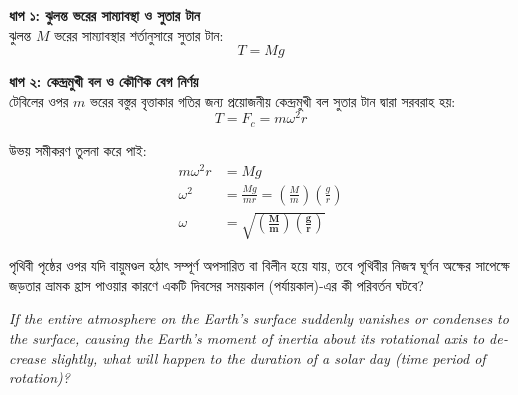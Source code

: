 \documentclass[12pt, a4paper]{article}
\begin{document}
\begin{tcolorbox}[solutionbox={সমাধান (Solution)}]
    \noindent
    \textbf{ধাপ ১: ঝুলন্ত ভরের সাম্যাবস্থা ও সুতার টান} \\
    ঝুলন্ত $M$ ভরের সাম্যাবস্থার শর্তানুসারে সুতার টান:
    \[ T = M g \]
    
    \vspace{0.5em}
    \noindent\textbf{ধাপ ২: কেন্দ্রমুখী বল ও কৌণিক বেগ নির্ণয়} \\
    টেবিলের ওপর $m$ ভরের বস্তুর বৃত্তাকার গতির জন্য প্রয়োজনীয় কেন্দ্রমুখী বল সুতার টান দ্বারা সরবরাহ হয়:
    \[ T = F_c = m \omega^2 r \]
    
    উভয় সমীকরণ তুলনা করে পাই:
    \begin{align*}
        m \omega^2 r &= M g \\
        \omega^2 &= \frac{M g}{m r} = \left(\frac{M}{m}\right)\left(\frac{g}{r}\right) \\
        \omega &= \mathbf{\sqrt{\left(\frac{M}{m}\right)\left(\frac{g}{r}\right)}}
    \end{align*}
\end{tcolorbox}

\newpage

\begin{tcolorbox}[questionbox={প্রশ্ন (Question) 33}]
    \noindent
    পৃথিবী পৃষ্ঠের ওপর যদি বায়ুমণ্ডল হঠাৎ সম্পূর্ণ অপসারিত বা বিলীন হয়ে যায়, তবে পৃথিবীর নিজস্ব ঘূর্ণন অক্ষের সাপেক্ষে জড়তার ভ্রামক হ্রাস পাওয়ার কারণে একটি দিবসের সময়কাল (পর্যায়কাল)-এর কী পরিবর্তন ঘটবে?
    
    \vspace{0.8em}
    \begin{english}
    \noindent\textit{\color{darkgray}
    If the entire atmosphere on the Earth's surface suddenly vanishes or condenses to the surface, causing the Earth's moment of inertia about its rotational axis to decrease slightly, what will happen to the duration of a solar day (time period of rotation)?
    }
    \end{english}
\end{tcolorbox}
\end{document}
